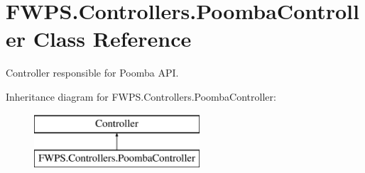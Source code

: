 \hypertarget{class_f_w_p_s_1_1_controllers_1_1_poomba_controller}{}\section{F\+W\+P\+S.\+Controllers.\+Poomba\+Controller Class Reference}
\label{class_f_w_p_s_1_1_controllers_1_1_poomba_controller}


Controller responsible for Poomba A\+PI.  


Inheritance diagram for F\+W\+P\+S.\+Controllers.\+Poomba\+Controller\+:\begin{figure}[H]
\begin{center}
\leavevmode
\includegraphics[height=2.000000cm]{class_f_w_p_s_1_1_controllers_1_1_poomba_controller}
\end{center}
\end{figure}

